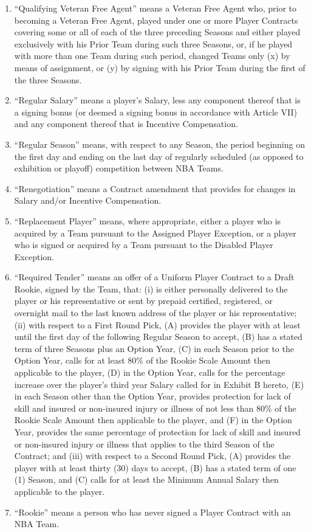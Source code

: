 \documentclass[
]{book}
\begin{document}
\begin{enumerate}
\item
  ``Qualifying Veteran Free Agent'' means a Veteran Free Agent who, prior to becoming a Veteran Free Agent, played under one or more Player Contracts covering some or all of each of the three preceding Seasons and either played exclusively with his Prior Team during such three Seasons, or, if he played with more than one Team during such period, changed Teams only (x) by means of assignment, or (y) by signing with his Prior Team during the first of the three Seasons.
\item
  ``Regular Salary'' means a player's Salary, less any component thereof that is a signing bonus (or deemed a signing bonus in accordance with Article VII) and any component thereof that is Incentive Compensation.
\item
  ``Regular Season'' means, with respect to any Season, the period beginning on the first day and ending on the last day of regularly scheduled (as opposed to exhibition or playoff) competition between NBA Teams.
\item
  ``Renegotiation'' means a Contract amendment that provides for changes in Salary and/or Incentive Compensation.
\item
  ``Replacement Player'' means, where appropriate, either a player who is acquired by a Team pursuant to the Assigned Player Exception, or a player who is signed or acquired by a Team pursuant to the Disabled Player Exception.
\item
  ``Required Tender'' means an offer of a Uniform Player Contract to a Draft Rookie, signed by the Team, that: (i) is either personally delivered to the player or his representative or sent by prepaid certified, registered, or overnight mail to the last known address of the player or his representative; (ii) with respect to a First Round Pick, (A) provides the player with at least until the first day of the following Regular Season to accept, (B) has a stated term of three Seasons plus an Option Year, (C) in each Season prior to the Option Year, calls for at least 80\% of the Rookie Scale Amount then applicable to the player, (D) in the Option Year, calls for the percentage increase over the player's third year Salary called for in Exhibit B hereto, (E) in each Season other than the Option Year, provides protection for lack of skill and insured or non-insured injury or illness of not less than 80\% of the Rookie Scale Amount then applicable to the player, and (F) in the Option Year, provides the same percentage of protection for lack of skill and insured or non-insured injury or illness that applies to the third Season of the Contract; and (iii) with respect to a Second Round Pick, (A) provides the player with at least thirty (30) days to accept, (B) has a stated term of one (1) Season, and (C) calls for at least the Minimum Annual Salary then applicable to the player.
\item
  ``Rookie'' means a person who has never signed a Player Contract with an NBA Team.


\end{enumerate}
\end{document}
